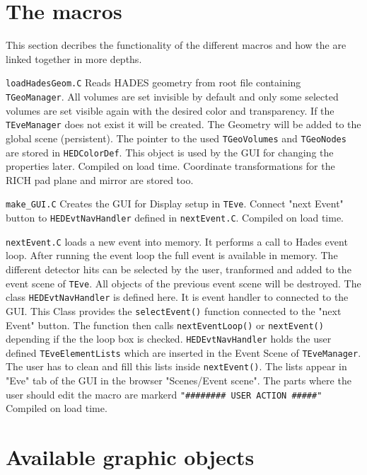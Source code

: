 \section{The macros}

This section decribes the functionality of the different
macros and how the are linked together in more depths.


\verb+loadHadesGeom.C+
Reads HADES geometry from root file containing \verb+TGeoManager+.
All volumes are set invisible by default and only some
selected volumes are set visible again with the desired
color and transparency. If the \verb+TEveManager+ does not
exist it will be created. The Geometry will be added
to the global scene (persistent). The pointer to the used
\verb+TGeoVolumes+ and \verb+TGeoNodes+ are stored in 
\verb+HEDColorDef+. This
object is used by the GUI for changing the properties later.
Compiled on load time. Coordinate transformations for the
RICH pad plane and mirror are stored too.

\verb+make_GUI.C+
Creates the GUI for Display setup in \verb+TEve+. Connect
"next Event" button to 
\newline
\verb+HEDEvtNavHandler+ defined in
\verb+nextEvent.C+. Compiled on load time.

\verb+nextEvent.C+
loads a new event into memory.
It performs a call to Hades event loop. After
running the event loop the full event is available
in memory. The different detector hits can be selected
by the user, tranformed and added to the event scene of
\verb+TEve+. All objects of the previous event scene will be
destroyed.
The class \verb+HEDEvtNavHandler+ is defined here. It
is event handler to connected to the GUI.
This Class provides the \verb+selectEvent()+ function connected
to the "next Event" button. The function then calls
\verb+nextEventLoop()+ or \verb+nextEvent()+ depending if 
the the loop box is checked.
\verb+HEDEvtNavHandler+ holds the user defined 
\verb+TEveElementLists+ which are inserted in the Event 
Scene of \verb+TEveManager+. The user has to clean and 
fill this lists inside \verb+nextEvent()+.
The lists appear in "Eve" tab of the GUI in the browser
"Scenes/Event scene". The parts where the user should
edit the macro are markerd \verb+"######## USER ACTION #####"+
Compiled on load time.

\section{Available graphic objects}

